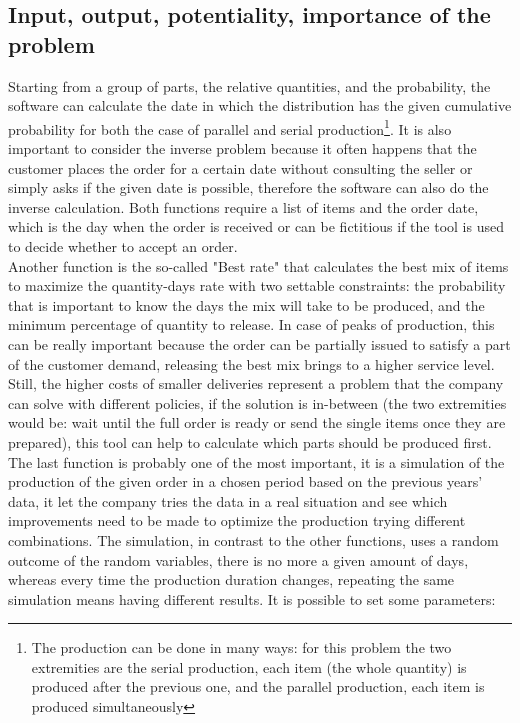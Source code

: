 \documentclass[a4paper,12pt]{article}
\begin{document}
\subsection{Input, output, potentiality, importance of the problem}
Starting from a group of parts, the relative quantities, and the probability, the software can calculate the date in which the distribution has the given cumulative probability for both the case of parallel and serial production\footnote{The production can be done in many ways: for this problem the two extremities are the serial production, each item (the whole quantity) is produced after the previous one, and the parallel production, each item is produced simultaneously}.  It is also important to consider the inverse problem because it often happens that the customer places the order for a certain date without consulting the seller or simply asks if the given date is possible, therefore the software can also do the inverse calculation. Both functions require a list of items and the order date, which is the day when the order is received or can be fictitious if the tool is used to decide whether to accept an order. \\
Another function is the so-called "Best rate" that calculates the best mix of items to maximize the quantity-days rate with two settable constraints: the probability that is important to know the days the mix will take to be produced, and the minimum percentage of quantity to release. In case of peaks of production, this can be really important because the order can be partially issued to satisfy a part of the customer demand, releasing the best mix brings to a higher service level. Still, the higher costs of smaller deliveries represent a problem that the company can solve with different policies, if the solution is in-between (the two extremities would be: wait until the full order is ready or send the single items once they are prepared), this tool can help to calculate which parts should be produced first. \\
The last function is probably one of the most important, it is a simulation of the production of the given order in a chosen period based on the previous years' data, it let the company tries the data in a real situation and see which improvements need to be made to optimize the production trying different combinations. The simulation, in contrast to the other functions, uses a random outcome of the random variables, there is no more a given amount of days, whereas every time the production duration changes, repeating the same simulation means having different results. It is possible to set some parameters:
\end{document}

